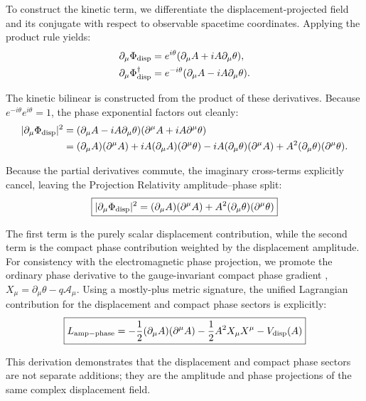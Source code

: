 \documentclass[11pt]{article}
\begin{document}
To construct the kinetic term, we differentiate the displacement-projected field and its conjugate with respect to observable spacetime coordinates. Applying the product rule yields:
\begin{align}
\partial_\mu \Phi_{\rm disp} &= e^{i\theta}(\partial_\mu A + iA\partial_\mu \theta), \\
\partial_\mu \Phi_{\rm disp}^\dagger &= e^{-i\theta}(\partial_\mu A - iA\partial_\mu \theta).
\end{align}

The kinetic bilinear is constructed from the product of these derivatives. Because $e^{-i\theta}e^{i\theta} = 1$, the phase exponential factors out cleanly:
\begin{align}
|\partial_\mu \Phi_{\rm disp}|^2 &= (\partial_\mu A - iA\partial_\mu \theta)(\partial^\mu A + iA\partial^\mu \theta) \nonumber \\
&= (\partial_\mu A)(\partial^\mu A) + iA(\partial_\mu A)(\partial^\mu \theta) - iA(\partial_\mu \theta)(\partial^\mu A) + A^2(\partial_\mu \theta)(\partial^\mu \theta).
\end{align}

Because the partial derivatives commute, the imaginary cross-terms explicitly cancel, leaving the Projection Relativity amplitude–phase split:
\begin{equation}
\boxed{ |\partial_\mu \Phi_{\rm disp}|^2 = (\partial_\mu A)(\partial^\mu A) + A^2(\partial_\mu \theta)(\partial^\mu \theta) }
\end{equation}

The first term is the purely scalar displacement contribution, while the second term is the compact phase contribution weighted by the displacement amplitude. For consistency with the electromagnetic phase projection, we promote the ordinary phase derivative to the gauge-invariant compact phase gradient \cite{weyl1927, YangMills1954}, $X_\mu = \partial_\mu \theta - q\mathcal A_\mu$. Using a mostly-plus metric signature, the unified Lagrangian contribution for the displacement and compact phase sectors is explicitly:
\begin{equation}
\boxed{ L_{\rm amp-phase} = -\frac{1}{2}(\partial_\mu A)(\partial^\mu A) - \frac{1}{2}A^2 X_\mu X^\mu - V_{\rm disp}(A) }
\end{equation}

This derivation demonstrates that the displacement and compact phase sectors are not separate additions; they are the amplitude and phase projections of the same complex displacement field.
\end{document}
